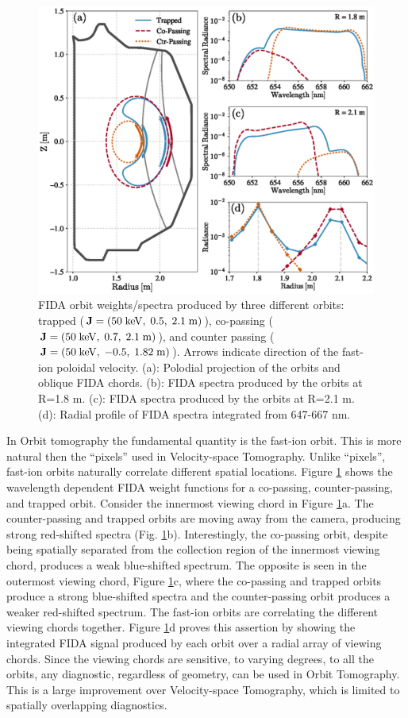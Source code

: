 \begin{figure}[h!]
    \centering
    \includegraphics[width=15cm]{figures/orbit_fida_spectra.eps}
    \caption{FIDA orbit weights/spectra produced by three different orbits: trapped ($\rm{\mathbf{J}=(50\;keV,\;0.5,\;2.1\;m)}$), co-passing ($\rm{\mathbf{J}=(50\;keV,\;0.7,\;2.1\;m)}$), and counter passing ($\rm{\mathbf{J}=(50\;keV,\;-0.5,\;1.82\;m)}$). Arrows indicate direction of the fast-ion poloidal velocity. (a): Polodial projection of the orbits and oblique FIDA chords. (b): FIDA spectra produced by the orbits at R=1.8 m. (c): FIDA spectra produced by the orbits at R=2.1 m. (d): Radial profile of FIDA spectra integrated from 647-667 nm.}
    \label{fig:orbit_fida_spectra}
\end{figure}
In Orbit tomography the fundamental quantity is the fast-ion orbit. This is more natural then the ``pixels'' used in Velocity-space Tomography. Unlike ``pixels'', fast-ion orbits naturally correlate different spatial locations.
Figure \ref{fig:orbit_fida_spectra} shows the wavelength dependent FIDA weight functions for a co-passing, counter-passing, and trapped orbit. Consider the innermost viewing chord in Figure \ref{fig:orbit_fida_spectra}a. The counter-passing and trapped orbits are moving away from the camera, producing strong red-shifted spectra (Fig. \ref{fig:orbit_fida_spectra}b). Interestingly, the co-passing orbit, despite being spatially separated from the collection region of the innermost viewing chord, produces a weak blue-shifted spectrum. The opposite is seen in the outermost viewing chord, Figure \ref{fig:orbit_fida_spectra}c, where the co-passing and trapped orbits produce a strong blue-shifted spectra and the counter-passing orbit produces a weaker red-shifted spectrum. The fast-ion orbits are correlating the different viewing chords together. Figure \ref{fig:orbit_fida_spectra}d proves this assertion by showing the integrated FIDA signal produced by each orbit over a radial array of viewing chords. Since the viewing chords are sensitive, to varying degrees, to all the orbits, any diagnostic, regardless of geometry, can be used in Orbit Tomography. This is a large improvement over Velocity-space Tomography, which is limited to spatially overlapping diagnostics. 


